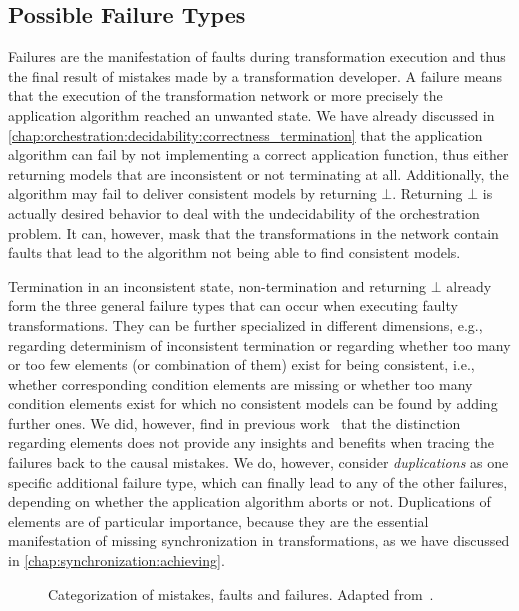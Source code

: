 \subsection{Possible Failure Types}
\label{chap:errors:categorization:failures}

Failures are the manifestation of faults during transformation execution and thus the final result of mistakes made by a transformation developer.
A failure means that the execution of the transformation network or more precisely the application algorithm reached an unwanted state.
We have already discussed in \autoref{chap:orchestration:decidability:correctness_termination} that the application algorithm can fail by not implementing a correct application function, thus either returning models that are inconsistent or not terminating at all.
Additionally, the algorithm may fail to deliver consistent models by returning $\bot$.
Returning $\bot$ is actually desired behavior to deal with the undecidability of the orchestration problem.
It can, however, mask that the transformations in the network contain faults that lead to the algorithm not being able to find consistent models.

Termination in an inconsistent state, non-termination and returning $\bot$ already form the three general failure types that can occur when executing faulty transformations.
They can be further specialized in different dimensions, e.g., regarding determinism of inconsistent termination or regarding whether too many or too few elements (or combination of them) exist for being consistent, i.e., whether corresponding condition elements are missing or whether too many condition elements exist for which no consistent models can be found by adding further ones.
We did, however, find in previous work~\cite[Tab.~5.7]{saglam2020ma} that the distinction regarding elements does not provide any insights and benefits when tracing the failures back to the causal mistakes.
We do, however, consider \emph{duplications} as one specific additional failure type, which can finally lead to any of the other failures, depending on whether the application algorithm aborts or not.
Duplications of elements are of particular importance, because they are the essential manifestation of missing synchronization in transformations, as we have discussed in \autoref{chap:synchronization:achieving}.

\begin{figure}
    \centering
    
    \caption[Categorization of mistakes, faults and failures]{Categorization of mistakes, faults and failures. Adapted from~.}
    \label{fig:errors:categorization}
\end{figure}

